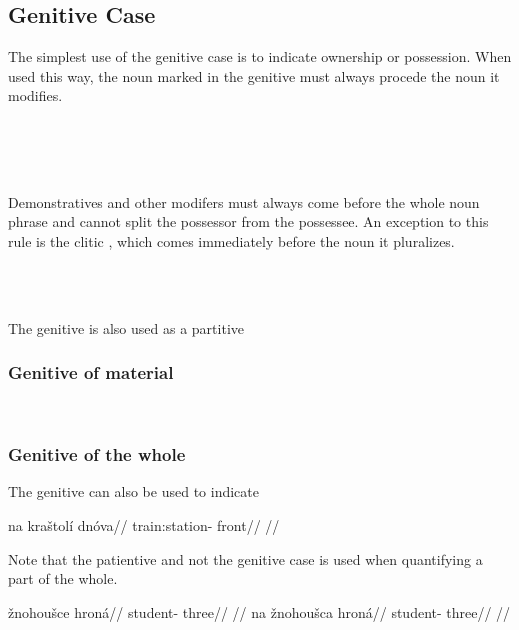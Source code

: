 \subsection{Genitive Case}

The simplest use of the genitive case is to indicate ownership or possession.
When used this way, the noun marked in the genitive must always procede the noun
it modifies.

\pex
{}\\
\\
\\
\xe

Demonstratives and other modifers must always come before
the whole noun phrase and cannot split the possessor from the possessee. An
exception to this rule is the clitic , which comes immediately before
the noun it pluralizes.

\pex
\a  {}\\
\a  {}\\
\xe

The genitive is also used as a partitive 


\subsubsection{Genitive of material}

\ex
{}\\
\xe

\subsubsection{Genitive of the whole}
The genitive can also be used to indicate

\pex
\begingl
\gla na kraštolí dnóva//
\glb \Loc{} train:station-\Gen{} front//
\glft {}//
\endgl
\xe

Note that the patientive and not the genitive case is used when quantifying a part of the whole.

\pex
\a
\begingl
\gla *žnohoušce hroná//
\glb student-\Gen{} three//
\glft {}//
\endgl
\a
\begingl
\gla na žnohoušca hroná//
\glb \Loc{} student-\Gen{} three//
\glft {}//
\endgl
\xe

